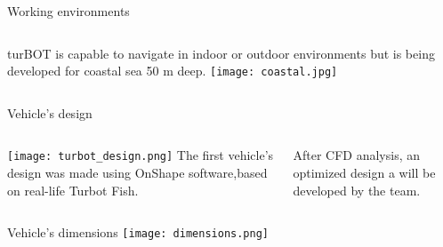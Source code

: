 \begin{frame}[t]{Working environments}
  \transdissolve[duration=0.5]
  \begin{columns}[c]
      turBOT is capable to navigate in indoor or outdoor environments but is being developed for coastal sea 50 m deep. 
      \texttt{[image: coastal.jpg]}
  \end{columns}
\end{frame}

\begin{frame}[t]{Vehicle's design}
  \transboxout[duration=0.5]
  \begin{columns}
      \texttt{[image: turbot\_design.png]}
      The first vehicle's design was made using OnShape software,based on real-life Turbot Fish. 

      After CFD analysis, an optimized design a will be developed by the team.
  \end{columns}
\end{frame}
\begin{frame}[t]{Vehicle's dimensions}
  \centering
  \texttt{[image: dimensions.png]}  
\end{frame}

